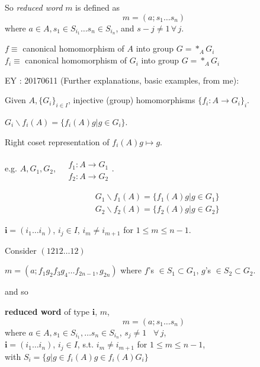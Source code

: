 So \emph{reduced word} $m$ is defined as 
\[
m = (a;s_1\dots s_n)
\]
where $a\in A, s_1\in S_{i_1} \dots s_n \in S_{i_n}$, and $s-j \neq 1\, \forall \, j$.  

$f\equiv $ canonical homomorphism of $A$ into group $G= *_A G_i$ \\ 
$f_i \equiv $ canonical homomorphism of $G_i$ into group $G= *_A G_i$

EY : 20170611 (Further explanations, basic examples, from me):  

Given $A, \lbrace G_i\rbrace_{i\in I}$, injective (group) homomorphisms $\lbrace f_i: A \to G_i\rbrace_i$.  

$G_i \backslash f_i(A) = \lbrace f_i(A)g | g\in G_i\rbrace$.  

Right coset representation of $f_i(A)g\mapsto g$.  

e.g. $A,G_1,G_2$, $\begin{aligned} & \quad \\
	& f_1:A \to G_1 \\
		& f_2 : A\to G_2 \end{aligned}$.  
		
	\[
	\begin{aligned}
	& G_1\backslash f_1(A) = \lbrace f_1(A)g| g\in G_1\rbrace \\
	& G_2\backslash f_2(A) = \lbrace f_2(A)g | g\in G_2 \rbrace
	\end{aligned}
	\]

$\mathbf{i} = (i_1\dots i_n)$, $i_j\in I$, $i_m\neq i_{m+1}$ for $1\leq m \leq n-1$.  

Consider $(1212\dots 12)$  

$m=(a;f_1 g_2 f_3 g_4 \dots f_{2n-1}, g_{2n})$ where $f$'s $\in S_1 \subset G_1$, $g$'s $\in S_2 \subset G_2$.  

and so 
\begin{definition}
	\textbf{reduced word} of type $\mathbf{i}$, $m$, \begin{equation}
	m=(a;s_1\dots s_n)
	\end{equation}
	where $a\in A, s_1 \in S_{i_1}, \dots s_n \in S_{i_n}$, $s_j\neq 1$ \, $\forall \, j$, \\
	\phantom{where } $\mathbf{i} = (i_1\dots i_n)$, $i_j \in I$, s.t. $i_m \neq i_{m+1}$ for $1\leq m \leq n-1$, \\
	with $S_i = \lbrace g | g\in f_i(A)g \in f_i(A) G_i\rbrace$  
\end{definition}




